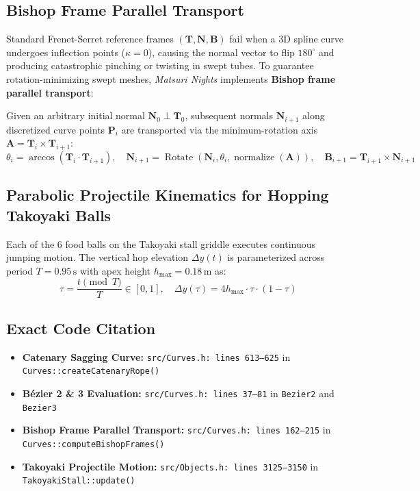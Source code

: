 \subsection{Bishop Frame Parallel Transport}
Standard Frenet-Serret reference frames $(\mathbf{T}, \mathbf{N}, \mathbf{B})$ fail when a 3D spline curve undergoes inflection points ($\kappa = 0$), causing the normal vector to flip $180^\circ$ and producing catastrophic pinching or twisting in swept tubes. To guarantee rotation-minimizing swept meshes, \textit{Matsuri Nights} implements \textbf{Bishop frame parallel transport}:

Given an arbitrary initial normal $\mathbf{N}_0 \perp \mathbf{T}_0$, subsequent normals $\mathbf{N}_{i+1}$ along discretized curve points $\mathbf{P}_i$ are transported via the minimum-rotation axis $\mathbf{A} = \mathbf{T}_i \times \mathbf{T}_{i+1}$:
\begin{equation}
\theta_i = \arccos\left( \mathbf{T}_i \cdot \mathbf{T}_{i+1} \right), \quad
\mathbf{N}_{i+1} = \operatorname{Rotate}\left( \mathbf{N}_i, \theta_i, \operatorname{normalize}(\mathbf{A}) \right), \quad
\mathbf{B}_{i+1} = \mathbf{T}_{i+1} \times \mathbf{N}_{i+1}
\label{eq:bishop_frame}
\end{equation}

\subsection{Parabolic Projectile Kinematics for Hopping Takoyaki Balls}
Each of the 6 food balls on the Takoyaki stall griddle executes continuous jumping motion. The vertical hop elevation $\Delta y(t)$ is parameterized across period $T = 0.95\,\text{s}$ with apex height $h_{\text{max}} = 0.18\,\text{m}$ as:
\begin{equation}
\tau = \frac{t \pmod T}{T} \in [0, 1], \quad \Delta y(\tau) = 4 h_{\text{max}} \cdot \tau \cdot (1 - \tau)
\label{eq:takoyaki_projectile}
\end{equation}

\subsection{Exact Code Citation}
\begin{itemize}
    \item \textbf{Catenary Sagging Curve:} \texttt{src/Curves.h: lines 613--625} in \texttt{Curves::createCatenaryRope()}
    \item \textbf{Bézier 2 \& 3 Evaluation:} \texttt{src/Curves.h: lines 37--81} in \texttt{Bezier2} and \texttt{Bezier3}
    \item \textbf{Bishop Frame Parallel Transport:} \texttt{src/Curves.h: lines 162--215} in \texttt{Curves::computeBishopFrames()}
    \item \textbf{Takoyaki Projectile Motion:} \texttt{src/Objects.h: lines 3125--3150} in \texttt{TakoyakiStall::update()}
\end{itemize}
